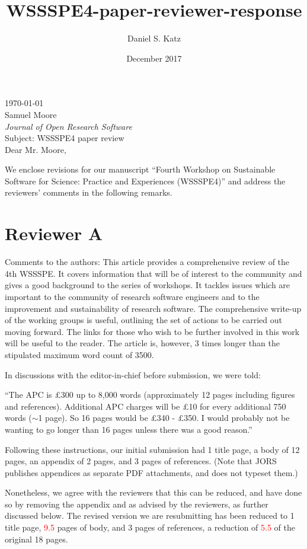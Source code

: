 \documentclass[11pt]{article}
\title{WSSSPE4-paper-reviewer-response}
\author{Daniel S. Katz}
\date{December 2017}
\begin{document}
\today\\

Samuel Moore\\
\textit{Journal of Open Research Software}\\

Subject: WSSSPE4 paper review\\

Dear Mr. Moore,

We enclose revisions for our manuscript ``Fourth Workshop on Sustainable Software for Science: Practice and Experiences
(WSSSPE4)'' and address the reviewers' comments in the following remarks.


\section*{Reviewer A}

\begin{quoting}
Comments to the authors: 
This article provides a comprehensive review of the 4th WSSSPE.  It covers information that will be of interest to the community and gives a good background to the series of workshops.  It tackles issues which are important to the community of research software engineers and to the improvement and sustainability of research software.
The comprehensive write-up of the working groups is useful, outlining the set of actions to be carried out moving forward. The links for those who wish to be further involved in this work will be useful to the reader.
The article is, however, 3 times longer than the stipulated maximum word count of 3500. 
\end{quoting}

In discussions with the editor-in-chief before submission, we were told:

``The APC is \pounds300 up to 8,000 words (approximately 12 pages including
figures and references). Additional APC charges will be \pounds10 for every
additional 750 words ($\sim$1 page).
So 16 pages would be \pounds340 - \pounds350. I would probably not be wanting to
go longer than 16 pages unless there was a good reason.''

Following these instructions, our initial submission had 1 title page, a body of 12 pages, an appendix of 2 pages, and 3 pages of references. (Note that JORS publishes appendices as separate PDF attachments, and does not typeset them.)

Nonetheless, we agree with the reviewers that this can be reduced, and have done so by removing the appendix and as advised by the reviewers, as further discussed below.  The revised version we are resubmitting has been reduced to 1 title page, \textcolor{red}{9.5} pages of body, and 3 pages of references, a reduction of \textcolor{red}{5.5} of the original 18 pages.
\end{document}
